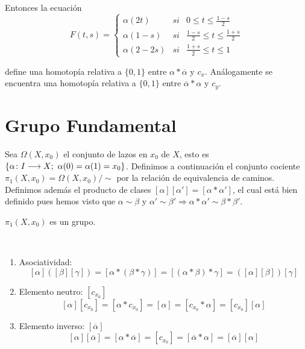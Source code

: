 \documentclass[GTS.tex]{subfiles}
\begin{document}
\begin{dem}
\begin{enumerate}

Entonces la ecuación
\[
F(t,s)=\left\{\begin{array}{lcc}
\alpha(2t) & si & 0\leq t\leq\frac{1-s}{2}\\
\alpha(1-s) & si & \frac{1-s}{2}\leq t\leq \frac{1+s}{2}\\
\alpha(2-2s) & si & \frac{1+s}{2}\leq t\leq 1
\end{array}\right.
\]



define una homotopía relativa a $\{0,1\}$ entre $\alpha*\overline{\alpha}$ y $c_x$. Análogamente se encuentra una homotopía relativa a $\{0,1\}$ entre $\overline{\alpha}*\alpha$ y $c_y$.
\end{enumerate}
\end{dem}

\section{Grupo Fundamental}
Sea $\Omega(X,x_0)$ el conjunto de lazos en $x_0$ de $X$, esto es $\{\alpha\func{I}{X};\ \alpha(0)=\alpha(1)=x_0\}$. Definimos a continuación el conjunto cociente $\pi_1(X,x_0)=\Omega(X,x_0)/\sim$ por la relación de equivalencia de caminos. Definimos además el producto de clases $[\alpha][\alpha']=[\alpha*\alpha']$, el cual está bien definido pues hemos visto que $\alpha\sim\beta$ y $\alpha'\sim\beta'\Rightarrow\alpha*\alpha'\sim\beta*\beta'$.

\begin{prop} $\pi_1(X,x_0)$ es un grupo.
\end{prop}
\begin{dem}\
\begin{enumerate}
\item Asociatividad:
\[
[\alpha]([\beta][\gamma])=[\alpha*(\beta*\gamma)]=[(\alpha*\beta)*\gamma]=([\alpha][\beta])[\gamma]
\]
\item Elemento neutro: $[c_{x_0}]$
\[
[\alpha][c_{x_0}]=[\alpha* c_{x_0}]=[\alpha]=[c_{x_0}*\alpha]=[c_{x_0}][\alpha]
\]
\item Elemento inverso: $[\overline{\alpha}]$
\[
[\alpha][\overline{\alpha}]=[\alpha*\overline{\alpha}]=[c_{x_0}]=[\overline{\alpha}*\alpha]=[\overline{\alpha}][\alpha]
\]
\end{enumerate}
\end{dem}
\end{document}
